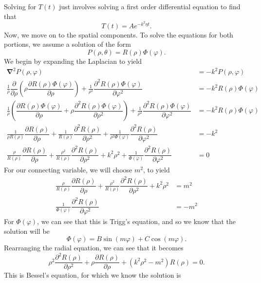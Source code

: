 \documentclass[11pt]{report}
\newcommand{\fdel}[2]{\dfrac{\partial{#1}}{\partial {#2}}} %
\newcommand{\sdel}[2]{\dfrac{\partial^2{#1}}{\partial{#2}^2}} %
\newcommand{\fpar}[1]{\left({#1}\right)}
\newcommand{\del}{\pmb{\nabla}}
\begin{document}
Solving for $T(t)$ just involves solving a first order differential equation to find that
    \begin{equation*}
        T(t) = Ae^{-k^2\eta t}.
    \end{equation*}
Now, we move on to the spatial components. To solve the equations for both portions, we assume a solution of the form
    \begin{equation*}
        P(\rho,\theta) = R(\rho)\Phi\fpar{\varphi }.
    \end{equation*}
We begin by expanding the Laplacian to yield\pagebreak
    \begin{align*}
         \del^2P\fpar{\rho,\varphi} &= -k^2P(\rho,\varphi)\\
        \frac{1}{\rho}\fdel{}{\rho}\fpar{\rho\fdel{R(\rho)\Phi\fpar{\varphi }}{\rho}} +\frac{1}{\rho^2}\sdel{R(\rho)\Phi\fpar{\varphi }}{\varphi}  &= -k^2 R(\rho)\Phi\fpar{\varphi }\\
        \frac{1}{\rho}\fpar{\fdel{R(\rho)\Phi\fpar{\varphi }}{\rho}+\rho\sdel{R(\rho)\Phi(\varphi)}{\rho}} +\frac{1}{\rho^2}\sdel{R(\rho)\Phi\fpar{\varphi }}{\varphi}  &= -k^2 R(\rho)\Phi\fpar{\varphi }\\
         \frac{1}{\rho R(\rho)}\fdel{R(\rho)}{\rho}+\frac{1}{R(\rho)}\sdel{R(\rho)}{\rho}   +\frac{1}{\rho^2\Phi(\varphi)}\sdel{R(\rho)}{\varphi}  &= -k^2\\
         \frac{\rho}{ R(\rho)}\fdel{R(\rho)}{\rho}+\frac{\rho^2}{R(\rho)}\sdel{R(\rho)}{\rho}  +k^2\rho^2  +\frac{1}{\Phi(\varphi)}\sdel{R(\rho)}{\varphi} &=0
    \end{align*}
For our connecting variable, we will choose $m^2$, to yield
    \begin{align*}
        \frac{\rho}{ R(\rho)}\fdel{R(\rho)}{\rho}+\frac{\rho^2}{R(\rho)}\sdel{R(\rho)}{\rho}  +k^2\rho^2 &= m^2\\
        \frac{1}{\Phi(\varphi)}\sdel{R(\rho)}{\varphi} &= -m^2
    \end{align*}
For $\Phi(\varphi)$, we can see that this is Trigg's equation, and so we know that the solution will be
    \begin{equation*}
        \Phi(\varphi) = B\sin\fpar{m\varphi}+C\cos\fpar{m\varphi}.
    \end{equation*}
Rearranging the radial equation, we can see that it becomes
\begin{equation*}
    \rho^2\sdel{R(\rho)}{\rho}+\rho\fdel{R(\rho)}{\rho}+\fpar{k^2\rho^2-m^2}R(\rho) = 0.
\end{equation*}
This is Bessel's equation, for which we know the solution is
\end{document}
